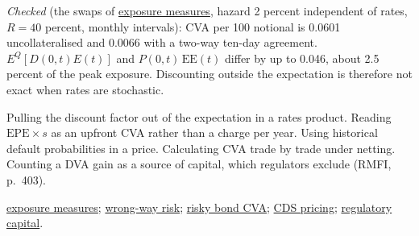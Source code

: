 \begin{qfmethod}
\emph{Checked} (the swaps of \hyperref[def:counterparty-exposure-measures]{exposure measures}, hazard 2 percent independent of rates, $R=40$ percent, monthly intervals): CVA per 100 notional is 0.0601 uncollateralised and 0.0066 with a two-way ten-day agreement. $E^Q[D(0,t)E(t)]$ and $P(0,t)\,\mathrm{EE}(t)$ differ by up to 0.046, about 2.5 percent of the peak exposure. Discounting outside the expectation is therefore not exact when rates are stochastic.

 Pulling the discount factor out of the expectation in a rates product. Reading $\mathrm{EPE}\times s$ as an upfront CVA rather than a charge per year. Using historical default probabilities in a price. Calculating CVA trade by trade under netting. Counting a DVA gain as a source of capital, which regulators exclude (RMFI, p.~403).

 \hyperref[def:counterparty-exposure-measures]{exposure measures}; \hyperref[def:wrong-way-risk]{wrong-way risk}; \hyperref[meth:risky-bond-cva]{risky bond CVA}; \hyperref[meth:cds-pricing]{CDS pricing}; \hyperref[rule:counterparty-credit-cva-capital]{regulatory capital}.

\end{qfmethod}

